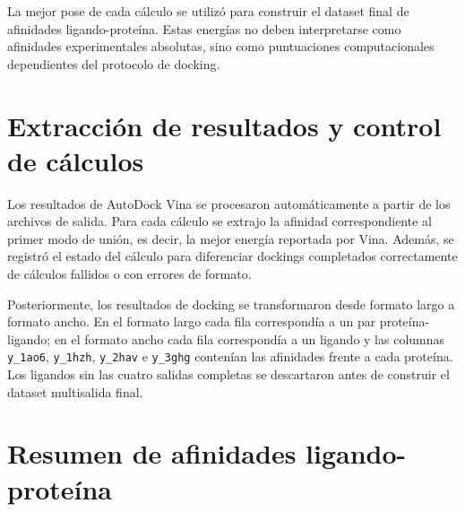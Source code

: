 \documentclass[
  spanish,
  a4paper,
  12pt,
  oneside,
  openany]{memoir}
\begin{document}
\begin{table}

\caption{\label{tbl-anexo-parametros-vina}Parámetros comunes de AutoDock Vina utilizados en el docking ligando-proteína.}


\end{table}%

La mejor pose de cada cálculo se utilizó para construir el dataset final
de afinidades ligando-proteína. Estas energías no deben interpretarse
como afinidades experimentales absolutas, sino como puntuaciones
computacionales dependientes del protocolo de docking.

\section{Extracción de resultados y control de cálculos}

Los resultados de AutoDock Vina se procesaron automáticamente a partir
de los archivos de salida. Para cada cálculo se extrajo la afinidad
correspondiente al primer modo de unión, es decir, la mejor energía
reportada por Vina. Además, se registró el estado del cálculo para
diferenciar dockings completados correctamente de cálculos fallidos o
con errores de formato.

Posteriormente, los resultados de docking se transformaron desde formato
largo a formato ancho. En el formato largo cada fila correspondía a un
par proteína-ligando; en el formato ancho cada fila correspondía a un
ligando y las columnas \texttt{y\_1ao6}, \texttt{y\_1hzh},
\texttt{y\_2hav} e \texttt{y\_3ghg} contenían las afinidades frente a
cada proteína. Los ligandos sin las cuatro salidas completas se
descartaron antes de construir el dataset multisalida final.

\section{Resumen de afinidades ligando-proteína}
\end{document}
